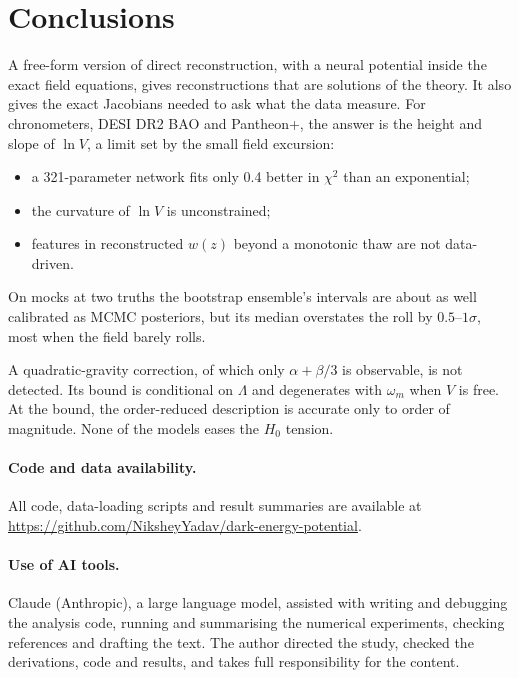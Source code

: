 \documentclass[11pt,a4paper]{article}
\begin{document}
\section{Conclusions}
A free-form version of direct reconstruction, with a neural potential inside the exact field equations, gives reconstructions that are solutions of the theory. It also gives the exact Jacobians needed to ask what the data measure. For chronometers, DESI DR2 BAO and Pantheon+, the answer is the height and slope of $\ln V$, a limit set by the small field excursion:
\begin{itemize}
\item a 321-parameter network fits only 0.4 better in $\chi^2$ than an exponential;
\item the curvature of $\ln V$ is unconstrained;
\item features in reconstructed $w(z)$ beyond a monotonic thaw are not data-driven.
\end{itemize}
On mocks at two truths the bootstrap ensemble's intervals are about as well calibrated as MCMC posteriors, but its median overstates the roll by $0.5$--$1\sigma$, most when the field barely rolls.

A quadratic-gravity correction, of which only $\alpha+\beta/3$ is observable, is not detected. Its bound is conditional on $\Lambda$ and degenerates with $\omega_m$ when $V$ is free. At the bound, the order-reduced description is accurate only to order of magnitude. None of the models eases the $H_0$ tension.

\paragraph{Code and data availability.} All code, data-loading scripts and result summaries are available at \url{https://github.com/NiksheyYadav/dark-energy-potential}.
\paragraph{Use of AI tools.} Claude (Anthropic), a large language model, assisted with writing and debugging the analysis code, running and summarising the numerical experiments, checking references and drafting the text. The author directed the study, checked the derivations, code and results, and takes full responsibility for the content.


\end{document}
